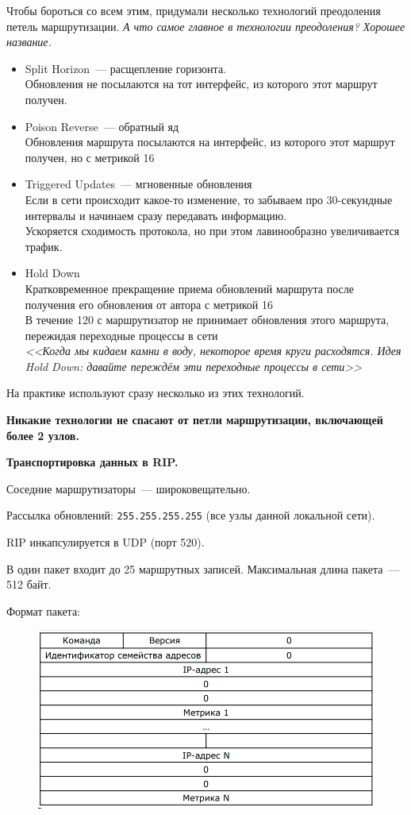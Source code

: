 Чтобы бороться со всем этим, придумали несколько технологий преодоления петель маршрутизации. {\it А что самое главное в технологии преодоления? Хорошее название.}
\begin{itemize}
    \item Split Horizon~--- расщепление горизонта.\\
    Обновления не посылаются на тот интерфейс, из которого этот маршрут получен. 
    \item Poison Reverse~--- обратный яд\\
    Обновления маршрута посылаются на интерфейс, из которого этот маршрут получен, но с метрикой 16
    \item Triggered Updates~--- мгновенные обновления\\
    Если в сети происходит какое-то изменение, то забываем про 30-секундные интервалы и начинаем сразу передавать информацию.\\
    Ускоряется сходимость протокола, но при этом лавинообразно увеличивается трафик.
    \item Hold Down\\
    Кратковременное прекращение приема обновлений маршрута после получения его обновления от автора с метрикой 16\\
    В течение 120 с маршрутизатор не принимает обновления этого маршрута, пережидая переходные процессы в сети\\
    {\it <<Когда мы кидаем камни в воду, некоторое время круги расходятся. Идея Hold Down: давайте переждём эти переходные процессы в сети>>}
\end{itemize}

На практике используют сразу несколько из этих технологий. 

{\bf Никакие технологии не спасают от петли маршрутизации, включающей более 2 узлов.}

{\bf Транспортировка данных в RIP.}

Соседние маршрутизаторы~--- широковещательно.

Рассылка обновлений: {\tt 255.255.255.255} (все узлы данной локальной сети).

RIP инкапсулируется в UDP (порт 520).

В один пакет входит до 25 маршрутных записей. Максимальная длина пакета~--- 512 байт.

Формат пакета:

\begin{figure}[H]
  \centering
  \includegraphics[width=15cm]{images/04/07}
\end{figure}

